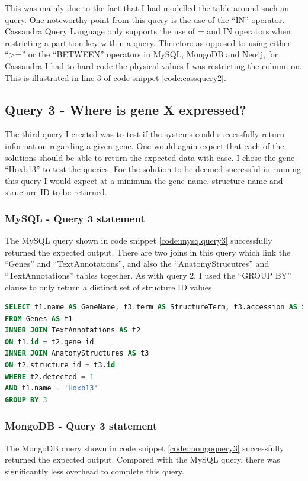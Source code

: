This was mainly due to the fact that I had modelled the table around such an query. One noteworthy point from this query is the use of the ``IN'' operator. Cassandra Query Language only supports the use of = and IN operators when restricting a partition key within a query. Therefore as opposed to using either ``>='' or the ``BETWEEN'' operators in MySQL, MongoDB and Neo4j, for Cassandra I had to hard-code the physical values I was restricting the column on. This is illustrated in line 3 of code snippet \ref{code:cassquery2}.

\subsection*{Query 3 - Where is gene X expressed?}\label{query3}
The third query I created was to test if the systems could successfully return information regarding a given gene. One would again expect that each of the solutions should be able to return the expected data with ease. I chose the gene ``Hoxb13'' to test the queries. For the solution to be deemed successful in running this query I would expect at a minimum the gene name, structure name and structure ID to be returned.

\subsubsection*{MySQL - Query 3 statement}\label{mysqlquery3statement}
The MySQL query shown in code snippet \ref{code:mysqlquery3} successfully returned the expected output. There are two joins in this query which link the ``Genes'' and ``TextAnnotations'', and also the ``AnatomyStrucutres'' and ``TextAnnotations'' tables together. As with query 2, I used the ``GROUP BY'' clause to only return a distinct set of structure ID values.

\begin{lstlisting}[language=SQL, caption=MySQL query 3 statement. Where is gene X expressed?., label=code:mysqlquery3]
SELECT t1.name AS GeneName, t3.term AS StructureTerm, t3.accession AS StructureID
FROM Genes AS t1
INNER JOIN TextAnnotations AS t2
ON t1.id = t2.gene_id
INNER JOIN AnatomyStructures AS t3
ON t2.structure_id = t3.id
WHERE t2.detected = 1
AND t1.name = 'Hoxb13'
GROUP BY 3
\end{lstlisting}
\newpage
\subsubsection*{MongoDB - Query 3 statement}\label{mongoquery3statement}
The MongoDB query shown in code snippet \ref{code:mongoquery3} successfully returned the expected output. Compared with the MySQL query, there was significantly less overhead to complete this query.


